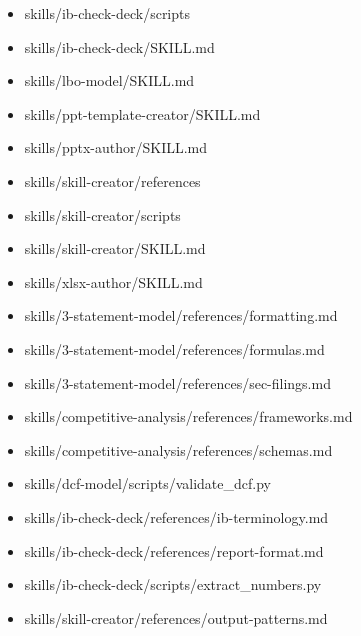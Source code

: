\documentclass[11pt]{article}
\begin{document}
\begin{itemize}[leftmargin=*,itemsep=1pt,topsep=2pt]
\item \hspace*{1.8em}skills/ib-check-deck/scripts
\item \hspace*{1.8em}skills/ib-check-deck/SKILL.md
\item \hspace*{1.8em}skills/lbo-model/SKILL.md
\item \hspace*{1.8em}skills/ppt-template-creator/SKILL.md
\item \hspace*{1.8em}skills/pptx-author/SKILL.md
\item \hspace*{1.8em}skills/skill-creator/references
\item \hspace*{1.8em}skills/skill-creator/scripts
\item \hspace*{1.8em}skills/skill-creator/SKILL.md
\item \hspace*{1.8em}skills/xlsx-author/SKILL.md
\item \hspace*{2.7em}skills/3-statement-model/references/formatting.md
\item \hspace*{2.7em}skills/3-statement-model/references/formulas.md
\item \hspace*{2.7em}skills/3-statement-model/references/sec-filings.md
\item \hspace*{2.7em}skills/competitive-analysis/references/frameworks.md
\item \hspace*{2.7em}skills/competitive-analysis/references/schemas.md
\item \hspace*{2.7em}skills/dcf-model/scripts/validate\_\allowbreak{}dcf.py
\item \hspace*{2.7em}skills/ib-check-deck/references/ib-terminology.md
\item \hspace*{2.7em}skills/ib-check-deck/references/report-format.md
\item \hspace*{2.7em}skills/ib-check-deck/scripts/extract\_\allowbreak{}numbers.py
\item \hspace*{2.7em}skills/skill-creator/references/output-patterns.md

\end{itemize}
\end{document}
